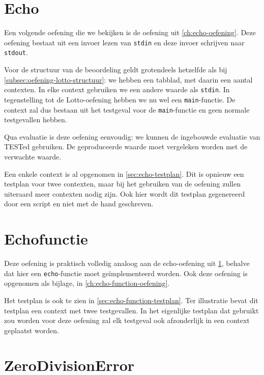 \inputminted[firstline=6,lastline=50,gobble=8]{json}{sources/lotto-plan.tson}

\section{Echo}\label{sec:oefening-echo}

Een volgende oefening die we bekijken is de oefening uit \cref{ch:echo-oefening}.
Deze oefening bestaat uit een invoer lezen van \texttt{stdin} en deze invoer schrijven naar \texttt{stdout}.

Voor de structuur van de beoordeling geldt grotendeels hetzelfde als bij \cref{subsec:oefening-lotto-structuur}: we hebben een tabblad, met daarin een aantal contexten.
In elke context gebruiken we een andere waarde als \texttt{stdin}.
In tegenstelling tot de Lotto-oefening hebben we nu wel een \texttt{main}-functie.
De context zal dus bestaan uit het testgeval voor de \texttt{main}-functie en geen normale testgevallen hebben.

Qua evaluatie is deze oefening eenvoudig: we kunnen de ingebouwde evaluatie van TESTed gebruiken.
De geproduceerde waarde moet vergeleken worden met de verwachte waarde.

Een enkele context is al opgenomen in \cref{sec:echo-testplan}.
Dit is opnieuw een testplan voor twee contexten, maar bij het gebruiken van de oefening zullen uiteraard meer contexten nodig zijn.
Ook hier wordt dit testplan gegenereerd door een script en niet met de hand geschreven.

\section{Echofunctie}\label{sec:oefening-echofunctie}

Deze oefening is praktisch volledig analoog aan de echo-oefening uit \cref{sec:oefening-echo}, behalve dat hier een \texttt{echo}-functie moet geïmplementeerd worden.
Ook deze oefening is opgenomen als bijlage, in \cref{ch:echo-function-oefening}.

Het testplan is ook te zien in \cref{sec:echo-function-testplan}.
Ter illustratie bevat dit testplan een context met twee testgevallen.
In het eigenlijke testplan dat gebruikt zou worden voor deze oefening zal elk testgeval ook afzonderlijk in een context geplaatst worden.

\section{ZeroDivisionError}\label{sec:oefening-zero}

